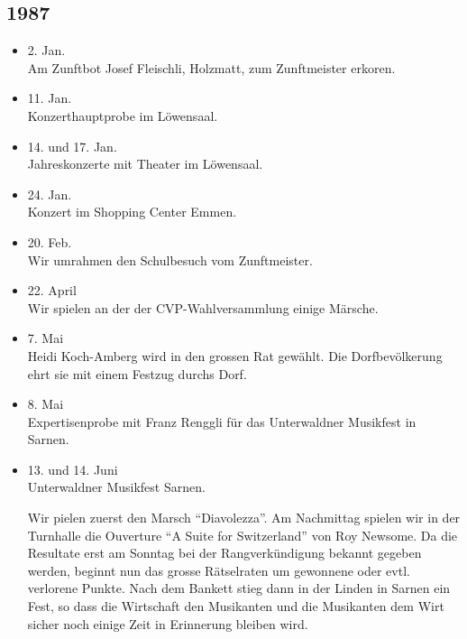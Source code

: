 \subsection*{1987}

\begin{history}


    \begin{itemize}

        \item 2. Jan.\\
              Am Zunftbot Josef Fleischli, Holzmatt, zum Zunftmeister erkoren.

        \item 11. Jan.\\
              Konzerthauptprobe im Löwensaal.

        \item 14. und 17. Jan.\\
              Jahreskonzerte mit Theater im Löwensaal.

        \item 24. Jan.\\
              Konzert im Shopping Center Emmen.

        \item 20. Feb.\\
              Wir umrahmen den Schulbesuch vom Zunftmeister.

        \item 22. April\\
              Wir spielen an der der CVP-Wahlversammlung einige Märsche.

        \item 7. Mai\\
              Heidi Koch-Amberg wird in den grossen Rat gewählt. Die Dorfbevölkerung
              ehrt sie mit einem Festzug durchs Dorf.

        \item 8. Mai\\
              Expertisenprobe mit Franz Renggli für das Unterwaldner Musikfest in
              Sarnen.

        \item 13. und 14. Juni\\
              Unterwaldner Musikfest Sarnen.

              Wir pielen zuerst den Marsch
              \enquote{Diavolezza}. Am Nachmittag spielen wir in der Turnhalle die
              Ouverture \enquote{A Suite for Switzerland} von Roy Newsome. Da die
              Resultate erst am Sonntag bei der Rangverkündigung bekannt gegeben
              werden, beginnt nun das grosse Rätselraten um gewonnene oder evtl.
              verlorene Punkte. Nach dem Bankett stieg dann in der Linden in Sarnen
              ein Fest, so dass die Wirtschaft den Musikanten und die Musikanten dem
              Wirt sicher noch einige Zeit in Erinnerung bleiben wird.


\end{itemize}
\end{history}
